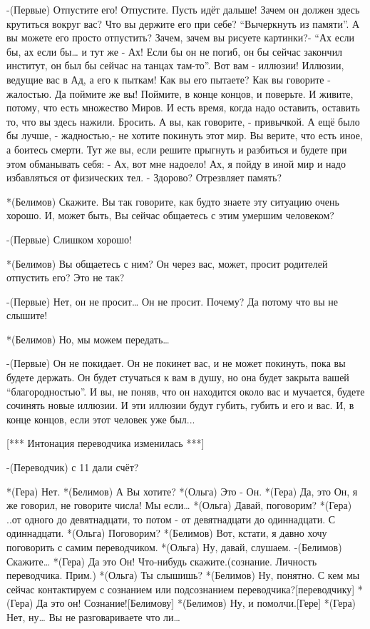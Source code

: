 -(Первые) Отпустите его! Отпустите. Пусть идёт дальше! Зачем он должен здесь крутиться вокруг вас? Что вы держите его при себе? “Вычеркнуть из памяти”.  А вы можете его просто отпустить? Зачем, зачем вы рисуете картинки?- “Ах если бы, ах если бы… и тут же -  Ах! Если бы он не погиб, он бы сейчас закончил институт, он был бы сейчас на танцах там-то”. Вот вам - иллюзии! Иллюзии, ведущие вас в Ад, а его к пыткам! Как вы его пытаете? Как вы говорите - жалостью. Да поймите же вы! Поймите, в конце концов,  и поверьте. И живите, потому,  что есть множество Миров. И есть время, когда надо оставить, оставить то, что вы здесь нажили. Бросить. А вы, как говорите, - привычкой. А ещё было бы лучше, -  жадностью,-  не хотите покинуть этот мир. Вы верите, что есть иное, а боитесь смерти. Тут же вы, если решите прыгнуть и разбиться и будете при этом обманывать себя: - Ах, вот мне надоело! Ах, я пойду в иной мир и надо избавляться от физических тел. - Здорово? Отрезвляет память?

*(Белимов) Скажите. Вы так говорите, как будто знаете эту ситуацию очень хорошо. И, может быть, Вы сейчас общаетесь с этим умершим человеком?

-(Первые) Слишком хорошо!

*(Белимов) Вы общаетесь с ним? Он через вас, может, просит родителей отпустить его? Это не так?

-(Первые) Нет, он не просит… Он не просит. Почему? Да потому что вы не слышите!

*(Белимов) Но, мы можем передать…

-(Первые) Он не покидает. Он не покинет вас, и не может покинуть, пока вы будете держать. Он будет стучаться к вам в душу, но она будет закрыта вашей “благородностью”. И вы, не поняв, что он находится около вас и мучается, будете сочинять новые иллюзии. И эти иллюзии будут губить, губить и его и вас. И, в конце концов, если этот человек уже был...

[*** Интонация переводчика изменилась ***]

-(Переводчик) с 11 дали счёт?

*(Гера) Нет.
*(Белимов) А Вы хотите?
*(Ольга) Это - Он.
*(Гера) Да, это Он, я же говорил, не говорите числа! Мы если…
*(Ольга) Давай, поговорим?
*(Гера) ..от одного до девятнадцати, то потом - от девятнадцати до одиннадцати. С одиннадцати.
*(Ольга) Поговорим?
*(Белимов) Вот, кстати, я давно хочу поговорить с самим переводчиком.
*(Ольга) Ну, давай, слушаем.
-(Белимов) Скажите…
*(Гера) Да это Он! Что-нибудь скажите.(сознание. Личность переводчика. Прим.)
*(Ольга) Ты слышишь?
*(Белимов) Ну, понятно. С кем мы сейчас контактируем с сознанием или подсознанием переводчика?[переводчику]
*(Гера) Да это он! Сознание![Белимову]
*(Белимов) Ну, и помолчи.[Гере]
*(Гера) Нет, ну… Вы не разговариваете что ли…

